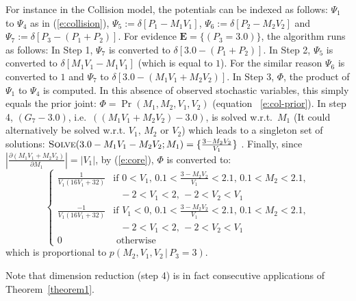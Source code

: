 \documentclass{article}
\newcommand{\bvec}[1]{\textbf{#1}}
\newcommand{\otherwise}[1]{#1 &\text{ otherwise}}
\newcommand{\pr}{p}
\begin{document}
For instance in the Collision model, 
the potentials can be indexed as follows: 
$\Psi_1$ to $\Psi_4$ as in (\ref{e:collision}),
$\Psi_5 := \delta[P_1 - M_1V_1]$,
$\Psi_6 := \delta[P_2 - M_2V_2]$ and
$\Psi_7 := \delta[P_3 - (P_1 + P_2)]$.   
For evidence $\bvec{E} = \{(P_3 = 3.0)\}$, the algorithm runs as follows:
In Step 1, $\Psi_{7}$ is converted to $\delta[3.0 - (P_1 + P_2)]$. %
In Step 2, $\Psi_5$ is converted to $\delta[M_1 V_1 - M_1 V_1]$
(which is equal to $1$). For the similar reason $\Psi_6$ is converted to $1$ and $\Psi_7$ to $\delta[3.0 - (M_1 V_1 + M_2 V_2)]$.  
In Step 3, $\Phi$, the product of $\Psi_1$ to $\Psi_4$ is computed. In this absence of observed stochastic variables, this simply equals the prior joint: 
$\Phi = \Pr(M_1, M_2, V_1, V_2)$ (equation~ \ref{e:col-prior}).
In step 4, $(G_7 - 3.0)$, i.e.\ $((M_1 V_1 + M_2 V_2) - 3.0)$, is solved w.r.t.\ 
 $M_1$ (It could alternatively be solved w.r.t. $V_1$, $M_2$ or $V_2$)
which leads to a singleton set of solutions:
{\footnotesize
$\textsc{Solve}(3.0 - M_1 V_1 - M_2 V_2; M_1) = \{\frac{3 - M_2 V_2}{V_1}\}$
}.
Finally, since  
$\left| \frac{\partial (M_1 V_1 + M_2 V_2)}{\partial M_1} \right| = |V_1|$, by (\ref{e:core}),
$\Phi$ is converted to:  
{\footnotesize
\begin{equation}  
\label{e:col-prior2}
\begin{cases}
\frac{1}{V_1(16 V_1 + 32)} &{\text{if }\scriptstyle 0<V_1, \, 0.1<\frac{3-M_2 V_2}{V_1}<2.1, \, 0.1<M_2<2.1,}\\
							 &{\;\;\, \scriptstyle -2<V_1<2, \, -2<V_2 < V_1}\\
\frac{-1}{V_1(16 V_1 + 32)} &{\text{if }\scriptstyle V_1<0, \, 0.1<\frac{3-M_2 V_2}{V_1}<2.1, \, 0.1<M_2<2.1,}\\
							 &{\;\;\, \scriptstyle -2<V_1<2, \, -2<V_2 < V_1}\\
 \otherwise{0}
 \end{cases}
\end{equation}
}
which is proportional to $\pr(M_2, V_1, V_2 \,|\, P_3 = 3)$.

Note that dimension reduction (step 4) is 
in fact consecutive applications of  Theorem~\ref{theorem1}.
\end{document}
